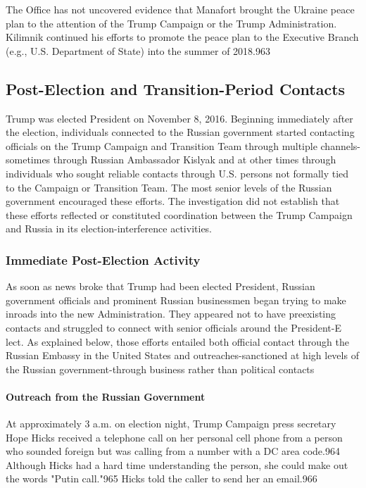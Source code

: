 The Office has not uncovered evidence that Manafort brought the Ukraine peace plan to the attention of the Trump Campaign or the Trump Administration. Kilimnik continued his efforts to promote the peace plan to the Executive Branch (e.g., U.S. Department of State) into the summer of 2018.963

\subsection{Post-Election and Transition-Period Contacts}

Trump was elected President on November 8, 2016. Beginning immediately after the election,  individuals connected to the Russian government started contacting officials on the Trump Campaign and Transition Team through multiple channels-sometimes through Russian Ambassador Kislyak and at other times through individuals who sought reliable contacts through U.S. persons not formally tied to the Campaign or Transition Team. The most senior levels of the Russian government encouraged these efforts. The investigation did not establish that these efforts reflected or constituted coordination between the Trump Campaign and Russia in its election-interference activities.

\subsubsection{Immediate Post-Election Activity}

As soon as news broke that Trump had been elected President, Russian government officials and prominent Russian businessmen began trying to make inroads into the new Administration. They appeared not to have preexisting contacts and struggled to connect with senior officials around the President-E lect. As explained below, those efforts entailed both official contact through the Russian Embassy in the United States and outreaches-sanctioned at high levels of the Russian government-through business rather than political contacts

\paragraph{Outreach from the Russian Government}

At approximately 3  a.m. on election night, Trump Campaign press secretary Hope Hicks received a telephone call on her personal cell phone from a  person who sounded foreign but was calling from a number with a DC area code.964 Although Hicks had a hard time understanding the person, she could make out the words "Putin call."965 Hicks told the caller to send her an email.966

